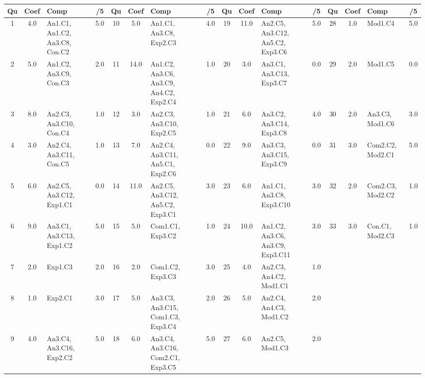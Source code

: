 \begin{center} 
\begin{tabular}{|c|c|m{1cm}|c||c|c|m{1cm}|c||c|c|m{1cm}|c||c|c|m{1cm}|c|} 
\hline \textbf{Qu} & \textbf{Coef} & \textbf{Comp} & \textbf{/5} & \textbf{Qu} & \textbf{Coef} & \textbf{Comp} & \textbf{/5} & \textbf{Qu} & \textbf{Coef} & \textbf{Comp} & \textbf{/5} & \textbf{Qu} & \textbf{Coef} & \textbf{Comp} & \textbf{/5} \\ 
\hline 
\hline 
1 & 4.0 & An1.C1, An1.C2, An3.C8, Con.C2 & 5.0 & 10 & 5.0 & An1.C1, An3.C8, Exp2.C3 & 4.0 & 19 & 11.0 & An2.C5, An3.C12, An5.C2, Exp3.C6 & 5.0 & 28 & 1.0 & Mod1.C4 & 5.0 \\ \hline 
2 & 5.0 & An1.C2, An3.C9, Con.C3 & 2.0 & 11 & 14.0 & An1.C2, An3.C6, An3.C9, An4.C2, Exp2.C4 & 1.0 & 20 & 3.0 & An3.C1, An3.C13, Exp3.C7 & 0.0 & 29 & 2.0 & Mod1.C5 & 0.0 \\ \hline 
3 & 8.0 & An2.C3, An3.C10, Con.C4 & 1.0 & 12 & 3.0 & An2.C3, An3.C10, Exp2.C5 & 1.0 & 21 & 6.0 & An3.C2, An3.C14, Exp3.C8 & 4.0 & 30 & 2.0 & An3.C3, Mod1.C6 & 3.0 \\ \hline 
4 & 3.0 & An2.C4, An3.C11, Con.C5 & 1.0 & 13 & 7.0 & An2.C4, An3.C11, An5.C1, Exp2.C6 & 0.0 & 22 & 9.0 & An3.C3, An3.C15, Exp3.C9 & 0.0 & 31 & 3.0 & Com2.C2, Mod2.C1 & 5.0 \\ \hline 
5 & 6.0 & An2.C5, An3.C12, Exp1.C1 & 0.0 & 14 & 11.0 & An2.C5, An3.C12, An5.C2, Exp3.C1 & 3.0 & 23 & 6.0 & An1.C1, An3.C8, Exp3.C10 & 3.0 & 32 & 2.0 & Com2.C3, Mod2.C2 & 1.0 \\ \hline 
6 & 9.0 & An3.C1, An3.C13, Exp1.C2 & 5.0 & 15 & 5.0 & Com1.C1, Exp3.C2 & 1.0 & 24 & 10.0 & An1.C2, An3.C6, An3.C9, Exp3.C11 & 3.0 & 33 & 3.0 & Con.C1, Mod2.C3 & 1.0 \\ \hline 
7 & 2.0 & Exp1.C3 & 2.0 & 16 & 2.0 & Com1.C2, Exp3.C3 & 3.0 & 25 & 4.0 & An2.C3, An4.C2, Mod1.C1 & 1.0 &  &  &  &  \\ \hline 

8 & 1.0 & Exp2.C1 & 3.0 & 17 & 5.0 & An3.C3, An3.C15, Com1.C3, Exp3.C4 & 2.0 & 26 & 5.0 & An2.C4, An4.C3, Mod1.C2 & 2.0 &  &  &  &  \\ \hline 

9 & 4.0 & An3.C4, An3.C16, Exp2.C2 & 5.0 & 18 & 6.0 & An3.C4, An3.C16, Com2.C1, Exp3.C5 & 5.0 & 27 & 6.0 & An2.C5, Mod1.C3 & 2.0 &  &  &  &  \\ \hline 

\end{tabular} 
\end{center} 
\normalsize 
 
